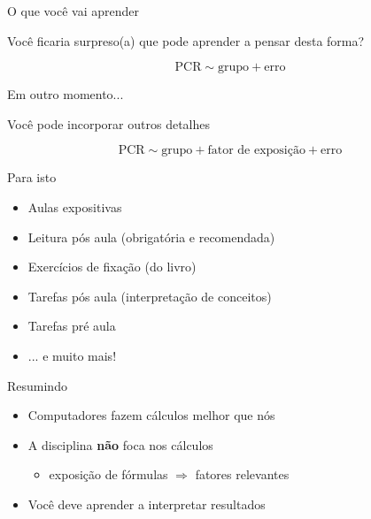 \documentclass{beamer}
\begin{document}
\begin{frame}{\scriptsize O que você vai aprender}
  \begin{block}{}
    \footnotesize
    Você ficaria surpreso(a) que pode aprender a pensar desta forma?
  \end{block}

  $$\text{PCR} \sim \text{grupo} + \text{erro}$$
\end{frame}

\begin{frame}{\scriptsize Em outro momento...}
  \begin{block}{}
    \footnotesize
    Você pode incorporar outros detalhes
  \end{block}

  $$\text{PCR} \sim \text{grupo} + \text{fator de exposição} + \text{erro}$$
\end{frame}

\begin{frame}{\scriptsize Para isto}
  \begin{itemize}
  \item Aulas expositivas
  \item Leitura pós aula (obrigatória e recomendada)
  \item Exercícios de fixação (do livro)
  \item Tarefas pós aula (interpretação de conceitos)
  \item Tarefas pré aula
  \item ... e muito mais!
  \end{itemize}
\end{frame}

\begin{frame}{\scriptsize Resumindo}
  \begin{itemize}
  \item Computadores fazem cálculos melhor que nós
  \item A disciplina {\bf não} foca nos cálculos
    \begin{itemize}
    \item exposição de fórmulas $\Rightarrow$ fatores relevantes
    \end{itemize}
  \item Você deve aprender a interpretar resultados
  \end{itemize}
\end{frame}

\end{document}
